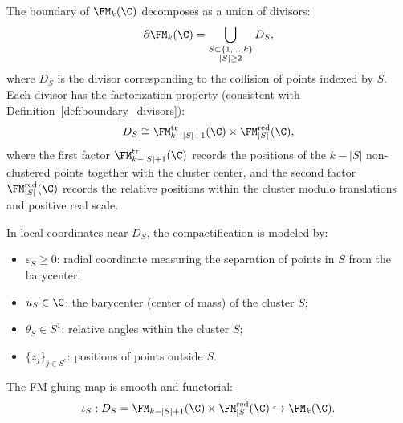 \begin{proposition}
\label{prop:FM_boundary}
The boundary of $\FM_k(\C)$ decomposes as a union of divisors:
\[
\partial \FM_k(\C) = \bigcup_{\substack{S \subset \{1, \ldots, k\} \\ |S| \geq 2}} D_S,
\]
where $D_S$ is the divisor corresponding to the collision of points indexed by $S$. Each divisor has the factorization property (consistent with Definition~\ref{def:boundary_divisors}):
\[
D_S \cong \FM_{k - |S| + 1}^{\mathrm{tr}}(\C) \times
\FM_{|S|}^{\mathrm{red}}(\C),
\]
where the first factor \(\FM_{k-|S|+1}^{\mathrm{tr}}(\C)\) records the
positions of the \(k-|S|\) non-clustered points together with the
cluster center, and the second factor
\(\FM_{|S|}^{\mathrm{red}}(\C)\) records the relative positions within
the cluster modulo translations and positive real scale.

In local coordinates near $D_S$, the compactification is modeled by:
\begin{itemize}
\item $\varepsilon_S \geq 0$: radial coordinate measuring the separation of points in $S$ from the barycenter;
\item $u_S \in \C$: the barycenter (center of mass) of the cluster $S$;
\item $\theta_S \in S^1$: relative angles within the cluster $S$;
\item $\{z_j\}_{j \in S^c}$: positions of points outside $S$.
\end{itemize}

The FM gluing map is smooth and functorial:
\[
\iota_S : D_S = \FM_{k-|S|+1}(\C) \times \FM_{|S|}^{\mathrm{red}}(\C) \hookrightarrow \FM_k(\C).
\]
\end{proposition}

